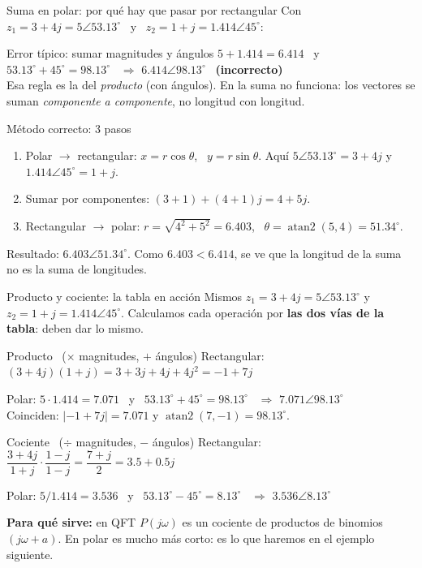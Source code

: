 \documentclass[aspectratio=169,11pt]{beamer}
\begin{document}
\begin{frame}{Suma en polar: por qué hay que pasar por rectangular}
  \small
  \setlength{\parskip}{2pt}
  Con $z_1=3+4j=5\angle 53.13^\circ$ \ y \ $z_2=1+j=1.414\angle 45^\circ$:

  \begin{alertblock}{Error típico: sumar magnitudes y ángulos}
    $5+1.414=6.414$ \ y \ $53.13^\circ+45^\circ=98.13^\circ$ \ $\Rightarrow$ $6.414\angle 98.13^\circ$ \ \textbf{(incorrecto)}\\
    Esa regla es la del \emph{producto} (con ángulos). En la suma no funciona: los vectores se suman \emph{componente a componente}, no longitud con longitud.
  \end{alertblock}

  \begin{block}{Método correcto: 3 pasos}
    \begin{enumerate}
      \item Polar $\to$ rectangular: $x=r\cos\theta$, \ $y=r\sin\theta$. Aquí $5\angle53.13^\circ=3+4j$ y $1.414\angle45^\circ=1+j$.
      \item Sumar por componentes: $(3+1)+(4+1)j=4+5j$.
      \item Rectangular $\to$ polar: $r=\sqrt{4^2+5^2}=6.403$, \ $\theta=\operatorname{atan2}(5,4)=51.34^\circ$.
    \end{enumerate}
    Resultado: $\boxed{6.403\angle 51.34^\circ}$. Como $6.403<6.414$, se ve que la longitud de la suma no es la suma de longitudes.
  \end{block}
\end{frame}

\begin{frame}{Producto y cociente: la tabla en acción}
  \small
  \setlength{\parskip}{2pt}
  \addtolength{\abovedisplayskip}{-4pt}
  Mismos $z_1=3+4j=5\angle 53.13^\circ$ y $z_2=1+j=1.414\angle 45^\circ$. Calculamos cada operación por \textbf{las dos vías de la tabla}: deben dar lo mismo.

  \begin{block}{Producto \ ($\times$ magnitudes, $+$ ángulos)}
    Rectangular: $(3+4j)(1+j)=3+3j+4j+4j^2=\boxed{-1+7j}$

    Polar: $5\cdot 1.414=7.071$ \ y \ $53.13^\circ+45^\circ=98.13^\circ$ \ $\Rightarrow$ $\boxed{7.071\angle 98.13^\circ}$\\
    Coinciden: $|{-1}+7j|=7.071$ y $\operatorname{atan2}(7,-1)=98.13^\circ$.
  \end{block}
  \begin{block}{Cociente \ ($\div$ magnitudes, $-$ ángulos)}
    Rectangular: $\dfrac{3+4j}{1+j}\cdot\dfrac{1-j}{1-j}=\dfrac{7+j}{2}=\boxed{3.5+0.5j}$

    Polar: $5/1.414=3.536$ \ y \ $53.13^\circ-45^\circ=8.13^\circ$ \ $\Rightarrow$ $\boxed{3.536\angle 8.13^\circ}$
  \end{block}
  \textbf{Para qué sirve:} en QFT $P(j\omega)$ es un cociente de productos de binomios $(j\omega+a)$. En polar es mucho más corto: es lo que haremos en el ejemplo siguiente.
\end{frame}
\end{document}
